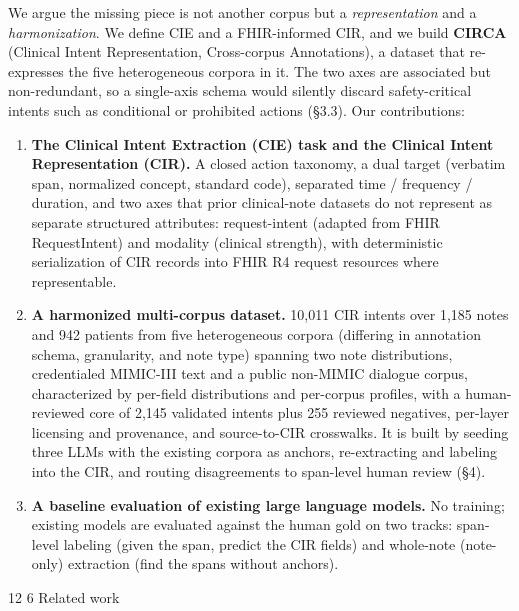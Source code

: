 \documentclass[3p,twocolumn]{elsarticle}
\makeatletter
\renewcommand\section{\@startsection {section}{1}{\z@}%
    {12\p@ \@plus 4\p@ \@minus 4\p@}%
    {6\p@ \@plus 4\p@ \@minus 3\p@}%
    {\normalsize\bfseries\boldmath}}
\makeatother
\begin{document}
We argue the missing piece is not another corpus but a \emph{representation} and a \emph{harmonization}. We define CIE and a FHIR-informed CIR, and we build \textbf{CIRCA} (Clinical Intent Representation, Cross-corpus Annotations), a dataset that re-expresses the five heterogeneous corpora in it. The two axes are associated but non-redundant, so a single-axis schema would silently discard safety-critical intents such as conditional or prohibited actions (§3.3). Our contributions:

\begin{enumerate}
\tightlist
\item
  \textbf{The Clinical Intent Extraction (CIE) task and the Clinical Intent Representation (CIR).} A closed action taxonomy, a dual target (verbatim span, normalized concept, standard code), separated time / frequency / duration, and two axes that prior clinical-note datasets do not represent as separate structured attributes: request-intent (adapted from FHIR RequestIntent) and modality (clinical strength), with deterministic serialization of CIR records into FHIR R4 request resources where representable.
\item
  \textbf{A harmonized multi-corpus dataset.} 10,011 CIR intents over 1,185 notes and 942 patients from five heterogeneous corpora (differing in annotation schema, granularity, and note type) spanning two note distributions, credentialed MIMIC-III text and a public non-MIMIC dialogue corpus, characterized by per-field distributions and per-corpus profiles, with a human-reviewed core of 2,145 validated intents plus 255 reviewed negatives, per-layer licensing and provenance, and source-to-CIR crosswalks. It is built by seeding three LLMs with the existing corpora as anchors, re-extracting and labeling into the CIR, and routing disagreements to span-level human review (§4).
\item
  \textbf{A baseline evaluation of existing large language models.} No training; existing models are evaluated against the human gold on two tracks: span-level labeling (given the span, predict the CIR fields) and whole-note (note-only) extraction (find the spans without anchors).
\end{enumerate}

\section{Related work}\label{related-work}
\end{document}
